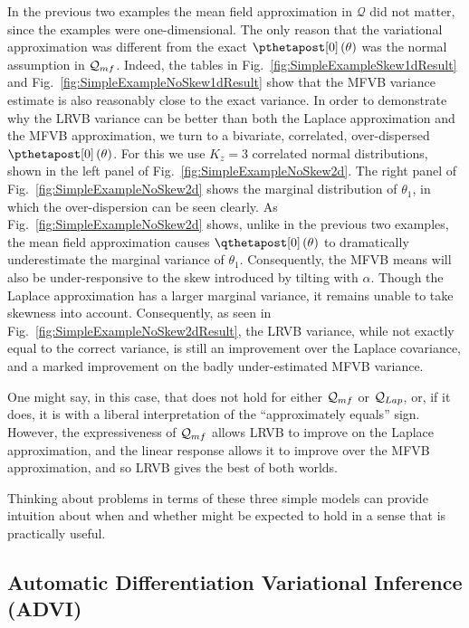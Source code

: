 \documentclass{article}\usepackage[]{graphicx}\usepackage[]{color}
\theoremstyle{definition}
\theoremstyle{plain}
\theoremstyle{plain}
\theoremstyle{plain}
\theoremstyle{definition}
\theoremstyle{plain}
\theoremstyle{plain}
\newcommand{\fig}[1]{Fig.~\ref{fig:#1}}
\begin{document}
In the previous two examples the mean field approximation in $\mathcal{Q}$ did
not matter, since the examples were one-dimensional. The only reason that the
variational approximation was different from the exact
$\pzeropost\left(\theta\right)$ was the normal assumption in $\mathcal{Q}_{mf}$. Indeed,
the tables in \fig{SimpleExampleSkew1dResult} and
\fig{SimpleExampleNoSkew1dResult} show that the MFVB variance estimate is also
reasonably close to the exact variance. In order to demonstrate why the LRVB
variance can be better than both the Laplace approximation and the MFVB
approximation, we turn to a bivariate, correlated, over-dispersed
$\pzeropost\left(\theta\right)$. For this we use $K_{z}=3$ correlated normal
distributions, shown in the left panel of \fig{SimpleExampleNoSkew2d}. The right
panel of \fig{SimpleExampleNoSkew2d} shows the marginal distribution of
$\theta_{1}$, in which the over-dispersion can be seen clearly.
As \fig{SimpleExampleNoSkew2d} shows, unlike in the previous two
examples, the mean field approximation causes $\qzeropost\left(\theta\right)$
to dramatically underestimate the marginal variance of $\theta_{1}$.
Consequently, the MFVB means will also be under-responsive to the
skew introduced by tilting with $\alpha$. Though the Laplace approximation
has a larger marginal variance, it remains unable to take skewness
into account. Consequently, as seen in \fig{SimpleExampleNoSkew2dResult},
the LRVB variance, while not exactly equal to the correct variance,
is still an improvement over the Laplace covariance, and a marked
improvement on the badly under-estimated MFVB variance.

One might say, in this case, that  does
not hold for either $\mathcal{Q}_{mf}$ or $\mathcal{Q}_{Lap}$, or, if it does, it is
with a liberal interpretation of the ``approximately equals'' sign.
However, the expressiveness of $\mathcal{Q}_{mf}$ allows LRVB to improve
on the Laplace approximation, and the linear response allows it to
improve over the MFVB approximation, and so LRVB gives the best of
both worlds.

Thinking about problems in terms of these three simple models can
provide intuition about when and whether 
might be expected to hold in a sense that is practically useful.
 
\subsection{Automatic Differentiation Variational Inference (ADVI)
\label{subsec:advi}}
\end{document}
